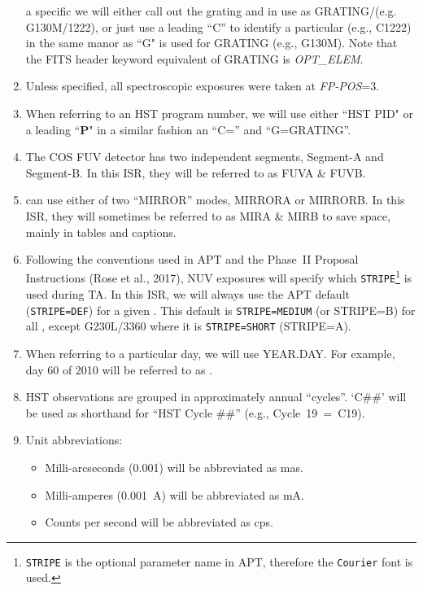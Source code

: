 \begin{enumerate}
{	a specific \cenwave we will either call out the grating and \cenwave in use as GRATING/\cenwave  (e.g. G130M/1222), or just use a leading ``C'' to identify a particular \cenwave (e.g., C1222) in the same manor as ``G" is used for GRATING (e.g., G130M).
	Note that the FITS header keyword equivalent of GRATING is \textit{OPT\_ELEM}.}
	\item{Unless specified, all spectroscopic exposures were taken at \textit{FP-POS}=3.}
	\item{When referring to an HST program number, we will use either ``HST PID" or a leading ``{\bf P}" in a similar fashion an ``C=\cenwave'' and ``G=GRATING''.}
	\item{The COS FUV detector has two independent segments, Segment-A and Segment-B. In this ISR, they will be referred to as FUVA \& FUVB.}
	\item{ can use either of two ``MIRROR'' modes, MIRRORA or MIRRORB. In this ISR, they will sometimes be referred to as MIRA \& MIRB to save space, mainly in tables and captions.}
	\item{Following the conventions used in APT and the Phase~II Proposal Instructions (Rose et al., 2017), NUV  exposures will specify which \texttt{STRIPE}\footnote{\texttt{STRIPE} is the optional parameter name in APT, therefore the \texttt{Courier} font is used.} is used during TA. In this ISR, we will always use
	the APT default (\texttt{STRIPE=DEF}) for a given \cenwave. This default is \texttt{STRIPE=MEDIUM} (or STRIPE=B) for all \cenwaves, except G230L/3360 where it is \texttt{STRIPE=SHORT} (STRIPE=A).}
	\item{When referring to a particular day, we will use YEAR.DAY. For example, day 60 of 2010 will be referred to as \psiafdate.
	}
	\item{HST observations are grouped in approximately annual ``cycles''. `C\#\#' will be used as shorthand for ``HST Cycle \#\#'' (e.g., Cycle~19~=~C19).}
	\item{Unit abbreviations:
		\begin{itemize}
		\item{Milli-arcseconds (0.001\arcsec) will be abbreviated as mas.}
		\item{Milli-amperes (0.001~A) will be abbreviated as mA.}
		\item{Counts per second will be abbreviated as cps.}
		\end{itemize}
}
\end{enumerate}
